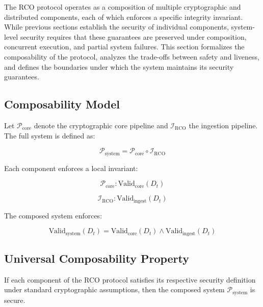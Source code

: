 The RCO protocol operates as a composition of multiple cryptographic and distributed components, each of which enforces a specific integrity invariant. While previous sections establish the security of individual components, system-level security requires that these guarantees are preserved under composition, concurrent execution, and partial system failures. This section formalizes the composability of the protocol, analyzes the trade-offs between safety and liveness, and defines the boundaries under which the system maintains its security guarantees.

\subsection{Composability Model}

Let $\mathcal{P}_{\text{core}}$ denote the cryptographic core pipeline and $\mathcal{I}_{\text{RCO}}$ the ingestion pipeline. The full system is defined as:

\begin{equation}
\mathcal{P}_{\text{system}} = \mathcal{P}_{\text{core}} \circ \mathcal{I}_{\text{RCO}}
\end{equation}

Each component enforces a local invariant:

\begin{equation}
\mathcal{P}_{\text{core}}: \text{Valid}_{\text{core}}(D_t)
\end{equation}

\begin{equation}
\mathcal{I}_{\text{RCO}}: \text{Valid}_{\text{ingest}}(D_t)
\end{equation}

The composed system enforces:

\begin{equation}
\text{Valid}_{\text{system}}(D_t) = \text{Valid}_{\text{core}}(D_t) \land \text{Valid}_{\text{ingest}}(D_t)
\end{equation}

\subsection{Universal Composability Property}

\begin{theorem}
If each component of the RCO protocol satisfies its respective security definition under standard cryptographic assumptions, then the composed system $\mathcal{P}_{\text{system}}$ is secure.
\end{theorem}

